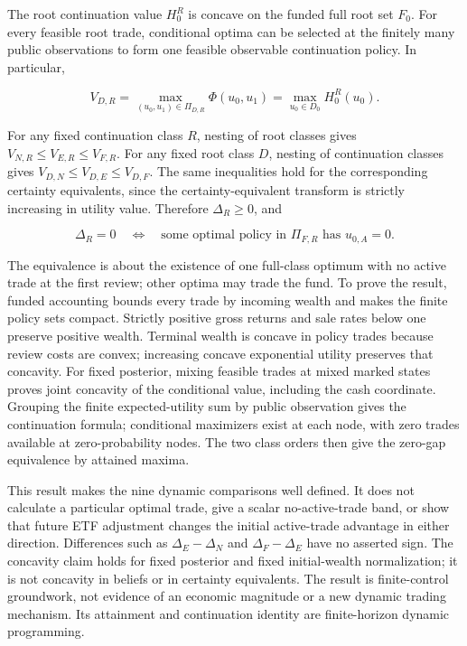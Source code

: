 \documentclass[11pt]{article}
\begin{document}
The root continuation value \(H_0^R\) is concave on the funded full
root set \(F_0\). For every feasible root trade, conditional optima
can be selected at the finitely many public observations to form
one feasible observable continuation policy. In particular,

\begin{equation*}
V_{D,R}
 =\max_{(u_0,u_1)\in\Pi_{D,R}}\Phi(u_0,u_1)
 =\max_{u_0\in D_0}H_0^R(u_0).
\tag{27}\label{eq:27}
\end{equation*}

For any fixed continuation class \(R\), nesting of root classes
gives \(V_{N,R}\leq V_{E,R}\leq V_{F,R}\). For any fixed root
class \(D\), nesting of continuation classes gives
\(V_{D,N}\leq V_{D,E}\leq V_{D,F}\). The same inequalities hold
for the corresponding certainty equivalents, since the
certainty-equivalent transform is strictly increasing in utility
value. Therefore \(\Delta_R\geq0\), and

\begin{equation*}
\Delta_R=0
\quad\Longleftrightarrow\quad
\text{some optimal policy in }\Pi_{F,R}
       \text{ has }u_{0,A}=0 .
\tag{28}\label{eq:28}
\end{equation*}

The equivalence is about the existence of one full-class optimum
with no active trade at the first review; other optima may trade
the fund. To prove the result, funded accounting bounds every
trade by incoming wealth and makes the finite policy sets
compact. Strictly positive gross returns and sale rates below
one preserve positive wealth. Terminal wealth is concave in
policy trades because review costs are convex; increasing
concave exponential utility preserves that concavity. For fixed
posterior, mixing feasible trades at mixed marked states proves
joint concavity of the conditional value, including the cash
coordinate. Grouping the finite expected-utility sum by public
observation gives the continuation formula; conditional
maximizers exist at each node, with zero trades available at
zero-probability nodes. The two class orders then give the
zero-gap equivalence by attained maxima.

This result makes the nine dynamic comparisons well defined.
It does not calculate a particular optimal trade, give a scalar
no-active-trade band, or show that future ETF adjustment changes
the initial active-trade advantage in either direction.
Differences such as \(\Delta_E-\Delta_N\) and
\(\Delta_F-\Delta_E\) have no asserted sign. The concavity claim
holds for fixed posterior and fixed initial-wealth normalization;
it is not concavity in beliefs or in certainty equivalents.
The result is finite-control groundwork, not evidence of an
economic magnitude or a new dynamic trading mechanism. Its attainment
and continuation identity are finite-horizon dynamic programming.
\end{document}
